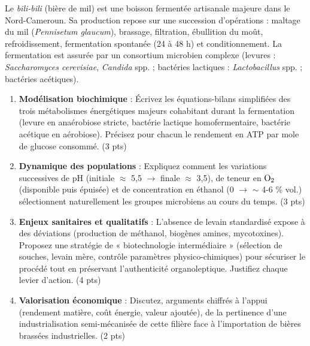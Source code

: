 \documentclass[11pt]{article}
\begin{document}
\begin{exercice}
Le \textit{bili-bili} (bière de mil) est une boisson fermentée artisanale majeure dans le Nord-Cameroun. Sa production repose sur une succession d'opérations : maltage du mil (\textit{Pennisetum glaucum}), brassage, filtration, ébullition du moût, refroidissement, fermentation spontanée (24 à 48 h) et conditionnement. La fermentation est assurée par un consortium microbien complexe (levures : \textit{Saccharomyces cerevisiae}, \textit{Candida} spp. ; bactéries lactiques : \textit{Lactobacillus} spp. ; bactéries acétiques).

\begin{enumerate}
    \item \textbf{Modélisation biochimique} : Écrivez les équations-bilans simplifiées des trois métabolismes énergétiques majeurs cohabitant durant la fermentation (levure en anaérobiose stricte, bactérie lactique homofermentaire, bactérie acétique en aérobiose). Précisez pour chacun le rendement en ATP par mole de glucose consommé. (3 pts)
    \item \textbf{Dynamique des populations} : Expliquez comment les variations successives de pH (initiale $\approx$ 5,5 $\to$ finale $\approx$ 3,5), de teneur en $\ce{O2}$ (disponible puis épuisée) et de concentration en éthanol (0 $\to$ $\sim$ 4-6 \% vol.) sélectionnent naturellement les groupes microbiens au cours du temps. (3 pts)
    \item \textbf{Enjeux sanitaires et qualitatifs} : L'absence de levain standardisé expose à des déviations (production de méthanol, biogènes amines, mycotoxines). Proposez une stratégie de « biotechnologie intermédiaire » (sélection de souches, levain mère, contrôle paramètres physico-chimiques) pour sécuriser le procédé tout en préservant l'authenticité organoleptique. Justifiez chaque levier d'action. (4 pts)
    \item \textbf{Valorisation économique} : Discutez, arguments chiffrés à l'appui (rendement matière, coût énergie, valeur ajoutée), de la pertinence d'une industrialisation semi-mécanisée de cette filière face à l'importation de bières brassées industrielles. (2 pts)
\end{enumerate}
\end{exercice}
\end{document}
